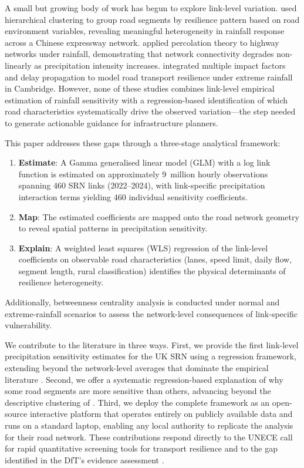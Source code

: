 \documentclass[review]{elsarticle}
\begin{document}
A small but growing body of work has begun to explore link-level variation. \citet{gao2024resilience} used hierarchical clustering to group road segments by resilience pattern based on road environment variables, revealing meaningful heterogeneity in rainfall response across a Chinese expressway network. \citet{li2024percolation} applied percolation theory to highway networks under rainfall, demonstrating that network connectivity degrades non-linearly as precipitation intensity increases. \citet{liu2026extreme} integrated multiple impact factors and delay propagation to model road transport resilience under extreme rainfall in Cambridge. However, none of these studies combines link-level empirical estimation of rainfall sensitivity with a regression-based identification of which road characteristics systematically drive the observed variation---the step needed to generate actionable guidance for infrastructure planners.

This paper addresses these gaps through a three-stage analytical framework:

\begin{enumerate}
    \item \textbf{Estimate}: A Gamma generalised linear model (GLM) with a log link function is estimated on approximately 9~million hourly observations spanning 460 SRN links (2022--2024), with link-specific precipitation interaction terms yielding 460 individual sensitivity coefficients.
    \item \textbf{Map}: The estimated coefficients are mapped onto the road network geometry to reveal spatial patterns in precipitation sensitivity.
    \item \textbf{Explain}: A weighted least squares (WLS) regression of the link-level coefficients on observable road characteristics (lanes, speed limit, daily flow, segment length, rural classification) identifies the physical determinants of resilience heterogeneity.
\end{enumerate}

\noindent Additionally, betweenness centrality analysis is conducted under normal and extreme-rainfall scenarios to assess the network-level consequences of link-specific vulnerability.

We contribute to the literature in three ways. First, we provide the first link-level precipitation sensitivity estimates for the UK SRN using a regression framework, extending beyond the network-level averages that dominate the empirical literature \citep{hranac2006empirical,koetse2009impact}. Second, we offer a systematic regression-based explanation of why some road segments are more sensitive than others, advancing beyond the descriptive clustering of \citet{gao2024resilience}. Third, we deploy the complete framework as an open-source interactive platform that operates entirely on publicly available data and runs on a standard laptop, enabling any local authority to replicate the analysis for their road network. These contributions respond directly to the UNECE call for rapid quantitative screening tools for transport resilience \citep{unece2024stress} and to the gap identified in the DfT's evidence assessment \citep{dft2024rea}.
\end{document}
